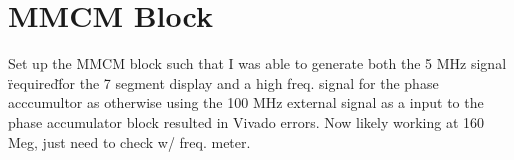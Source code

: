 \documentclass[a4paper,12pt]{report}
\begin{document}
\section*{MMCM Block}
Set up the MMCM block such that I was able to generate both the 5 MHz signal \"required\" for the 7 segment display and a high freq. signal for the phase acccumultor as otherwise using the 100 MHz external signal as a input to the phase accumulator block resulted in Vivado errors. Now likely working at 160 Meg, just need to check w/ freq. meter.
\end{document}
